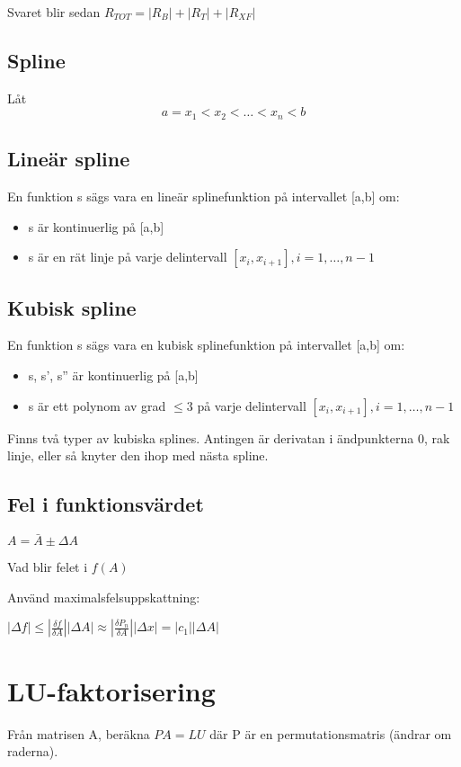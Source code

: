 \documentclass[12pt,a4paper]{article}
\begin{document}
Svaret blir sedan $R_{TOT} = | R_B | + | R_T | + |R_{XF}| $

\subsection{Spline}
Låt 
$$ a = x_1 < x_2 < \ldots < x_n < b $$

\subsection{Lineär spline}
En funktion s sägs vara en lineär splinefunktion på intervallet [a,b] om:
\begin{itemize}
\item{s är kontinuerlig på [a,b]}
\item{s är en rät linje på varje delintervall $[x_i,x_{i+1}], i = 1,\ldots,n-1 $}
\end{itemize}

\subsection{Kubisk spline}
En funktion s sägs vara en kubisk splinefunktion på intervallet [a,b] om:
\begin{itemize}
\item{s, s', s'' är kontinuerlig på [a,b]}
\item{s är ett polynom av grad $\leq 3$ på varje delintervall $[x_i,x_{i+1}], i = 1,\ldots,n-1 $}
\end{itemize}

Finns två typer av kubiska splines.
Antingen är derivatan i ändpunkterna 0, rak linje, eller så knyter den ihop med nästa spline.

\subsection{Fel i funktionsvärdet}

$A = \bar{A} \pm \Delta A $

Vad blir felet i $f(A)$

Använd maximalsfelsuppskattning:

$|\Delta f| \leq |\frac{\delta f}{\delta A}| |\Delta A| \approx |\frac{\delta P_n}{\delta A}| |\Delta x| = |c_1||\Delta A|$ 

\section{LU-faktorisering}
Från matrisen A, beräkna $PA=LU$ där P är en permutationsmatris (ändrar om raderna).
\end{document}
